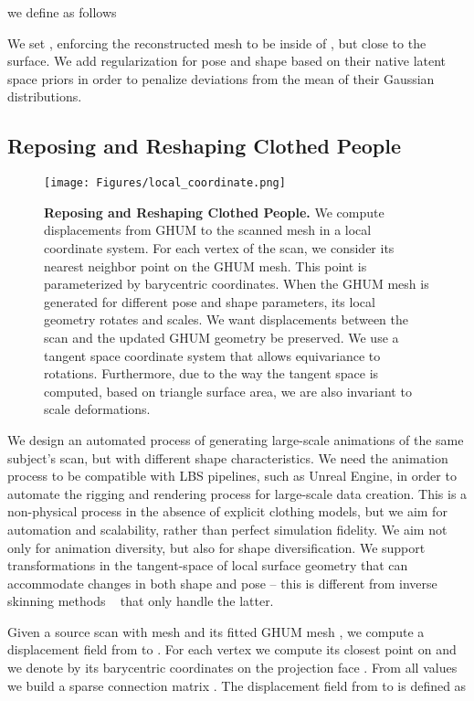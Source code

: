 \documentclass[10pt,twocolumn,letterpaper]{article}
\begin{document}
we define  as follows


We set , enforcing the reconstructed mesh  to be inside of , but close to the surface. We add regularization for pose and shape based on their native latent space priors   in order to penalize deviations from the mean of their Gaussian distributions.

\subsection{Reposing and Reshaping Clothed People}
\label{sec:reposing}
\begin{figure}[!htbp]
\begin{center}
    \texttt{[image: Figures/local\_coordinate.png]}
\end{center}
\vspace{-4mm}
\caption{\small \textbf{Reposing and Reshaping Clothed People.} We compute displacements from GHUM to the scanned mesh in a local coordinate system. For each vertex of the scan, we consider its nearest neighbor point on the GHUM mesh. This point is parameterized by barycentric coordinates. When the GHUM mesh is generated for different pose and shape parameters, its local geometry rotates and scales. We want displacements between the scan and the updated GHUM geometry be preserved. We use a tangent space coordinate system that allows equivariance to rotations. Furthermore, due to the way the tangent space is computed, based on triangle surface area, we are also invariant to scale deformations.}
\label{fig:local_coordinate}
\end{figure}
We design an automated process of generating large-scale animations of the same subject's scan, but with different shape characteristics.
We need the animation process to be compatible with LBS pipelines, such as Unreal Engine, in order to automate the rigging and rendering process for large-scale data creation. This is a non-physical process in the absence of explicit clothing models, but we aim for automation and scalability, rather than perfect simulation fidelity. 
We aim not only for animation diversity, but also for shape diversification. We support transformations in the tangent-space of local surface geometry  that can accommodate changes in both shape and pose – this is different from inverse skinning methods ~\cite{huang2020arch} that only handle the latter.

\vspace{3mm}

 Given a source scan with mesh  and its fitted GHUM mesh , we compute a displacement field  from  to . For each vertex  we compute its closest point  on  and we denote by  its barycentric coordinates on the projection face . From all values  we build a sparse connection matrix . The displacement field 
 from  to  is defined as 
\end{document}
